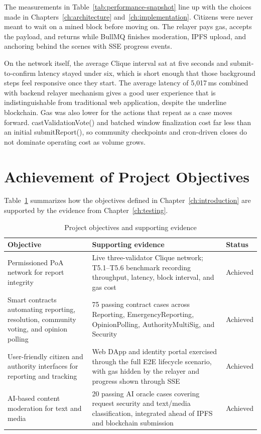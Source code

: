The measurements in Table~\ref{tab:performance-snapshot} line up with the choices made in Chapters~\ref{ch:architecture} and~\ref{ch:implementation}. Citizens were never meant to wait on a mined block before moving on. The relayer pays gas, accepts the payload, and returns while BullMQ finishes moderation, \ac{IPFS} upload, and anchoring behind the scenes with \ac{SSE} progress events.

On the network itself, the average Clique interval sat at five seconds and submit-to-confirm latency stayed under six, which is short enough that those background steps feel responsive once they start. The average latency of 5{,}017\,ms combined with backend relayer mechanism gives a good user experience that is indistinguishable from traditional web application, despite the underline blockchain. Gas was also lower for the actions that repeat as a case moves forward. castValidationVote() and batched window finalization cost far less than an initial submitReport(), so community checkpoints and cron-driven closes do not dominate operating cost as volume grows.

\section{Achievement of Project Objectives}
\label{sec:objective-assessment}

Table~\ref{tab:objective-assessment} summarizes how the objectives defined in Chapter~\ref{ch:introduction} are supported by the evidence from Chapter~\ref{ch:testing}.

\begin{table}[htbp]
\centering
\caption{Project objectives and supporting evidence}
\label{tab:objective-assessment}
\begin{tabular}{p{}|p{}|p{}}
    
    Objective & Supporting evidence & Status \\
    \hline
    Permissioned PoA network for report integrity & Live three-validator Clique network; T5.1--T5.6 benchmark recording throughput, latency, block interval, and gas cost & Achieved \\
    \hline
    Smart contracts automating reporting, resolution, community voting, and opinion polling & 75 passing contract cases across    {Reporting},    {EmergencyReporting},    {OpinionPolling},    {AuthorityMultiSig}, and    {Security} & Achieved \\
    \hline
    User-friendly citizen and authority interfaces for reporting and tracking & Web \ac{DApp} and identity portal exercised through the full \ac{E2E} lifecycle scenario, with gas hidden by the relayer and progress shown through SSE & Achieved \\
    \hline
    AI-based content moderation for text and media & 20 passing AI oracle cases covering request security and text/media classification, integrated ahead of IPFS and blockchain submission & Achieved \\
    
\end{tabular}
\end{table}

